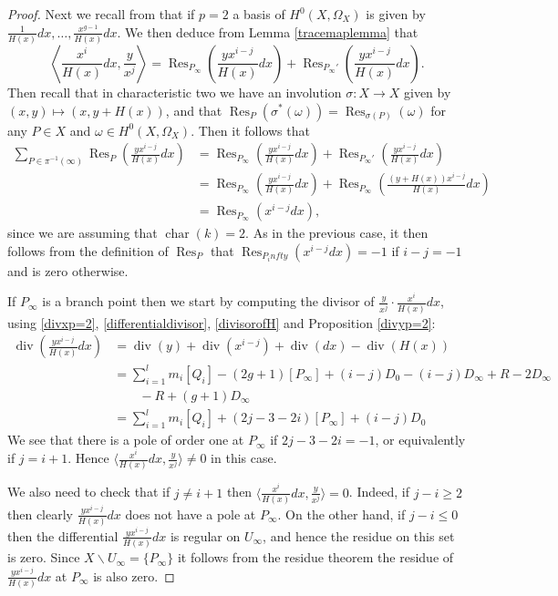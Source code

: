 \documentclass[draft, 11pt]{article} %
\theoremstyle{plain}
\theoremstyle{remark}
\newcommand{\ra}{\rightarrow}
\newcommand{\hzero}{{H^0(X,\Omega_X)}}
\DeclareMathOperator{\res}{Res}
\DeclareMathOperator{\di}{div}
\DeclareMathOperator{\cha}{char}
\begin{document}
\begin{proof}
Next we recall from \cite[Chap 7, Prop. 4.26]{liu} that if $p=2$ a basis of $\hzero$ is given by $\frac{1}{H(x)}dx, \ldots, \frac{x^{g-1}}{H(x)}dx$.
We then deduce from Lemma \ref{tracemaplemma} that
\[
\left \langle \frac{x^i}{H(x)}dx, \frac{y}{x^j} \right \rangle = \res_{P_\infty} \left( \frac{yx^{i-j}}{H(x)}dx \right) + \res_{P_\infty'}\left( \frac{yx^{i-j}}{H(x)} dx \right).
\]
Then recall that in characteristic two we have an involution $\sigma \colon X \ra X$ given by $(x,y) \mapsto (x, y + H(x))$, and that $\res_P(\sigma^*(\omega)) = \res_{\sigma(P)}(\omega)$ for any $P \in X$ and $\omega\in \hzero$.
Then it follows that
\begin{align*}
\sum_{P \in \pi^{-1}(\infty)} \res_P \left( \frac{yx^{i-j}}{H(x)}dx \right) & = \res_{P_\infty} \left( \frac{yx^{i-j}}{H(x)} dx \right) + \res_{P_\infty'}\left( \frac{yx^{i-j}}{H(x)} dx\right) \\
& = \res_{P_ \infty} \left( \frac{yx^{i-j}}{H(x)}dx \right) + \res_{P_ \infty} \left( \frac{(y+H(x))x^{i-j}}{H(x)}dx \right) \\
& = \res_{P_\infty}(x^{i-j}dx),
\end{align*}
since we are assuming that $\cha(k) = 2$.
As in the previous case, it then follows from the definition of $\res_P$ that $\res_{P_infty}(x^{i-j}dx) = -1$ if $i-j = -1$ and is zero otherwise.



If $P_\infty$ is a branch point then we start by computing the divisor of $ \frac{y}{x^j} \cdot \frac{x^i}{H(x)}dx$, using \eqref{divxp=2}, \eqref{differentialdivisor}, \eqref{divisorofH} and Proposition \ref{divyp=2}:
\begin{align*}
\di\left( \frac{yx^{i-j}}{H(x)}dx \right) & = \di(y) + \di(x^{i-j}) + \di( dx) - \di(H(x)) \\
& = \sum_{i=1}^l m_i[Q_i] - (2g+ 1 )[P_\infty] + (i-j)D_0 - (i-j)D_\infty + R - 2D_\infty \\
& \qquad - R + (g+1)D_\infty\\
& = \sum_{i=1}^l m_i[Q_i] + (2j-3-2i)[P_\infty] + (i-j)D_0
\end{align*}
We see that there is a pole of order one at $P_\infty$ if $2j - 3 - 2i = -1$, or equivalently if $j = i+1$.
Hence $\langle \frac{x^i}{H(x)}dx, \frac{y}{x^j} \rangle \neq 0$ in this case.

We also need to check that if $j \neq i+1$ then $\langle \frac{x^i}{H(x)}dx, \frac{y}{x^j} \rangle = 0$.
Indeed, if $j-i \geq 2$ then clearly $\frac{yx^{i-j}}{H(x)}dx$ does not have a pole at $P_\infty$.
On the other hand, if $j-i \leq 0$ then the differential $\frac{yx^{i-j}}{H(x)}dx$ is regular on $U_\infty$, and hence the residue on this set is zero.
Since $X \backslash U_\infty = \{P_\infty\}$ it follows from the residue theorem the residue of $\frac{yx^{i-j}}{H(x)}dx$ at $P_\infty$ is also zero.
\end{proof}
\end{document}
